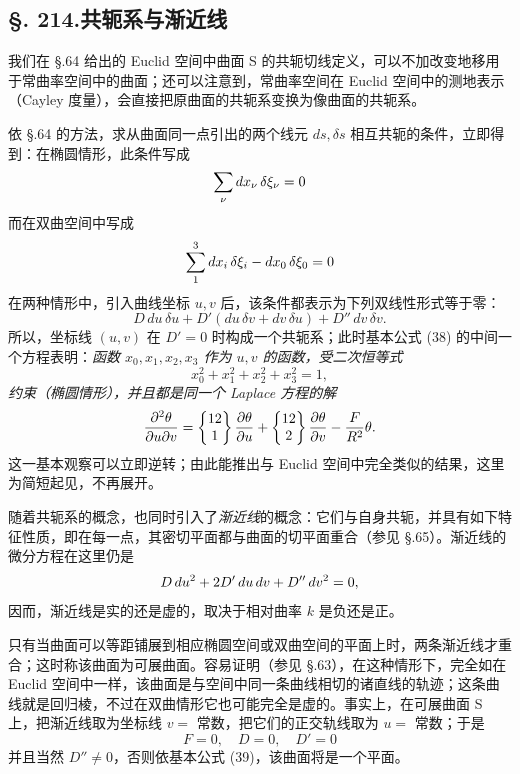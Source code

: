 \subsection*{\S. 214.\quad 共轭系与渐近线}

我们在 \S.64 给出的 Euclid 空间中曲面 S 的共轭切线定义，可以不加改变地移用于常曲率空间中的曲面；还可以注意到，常曲率空间在 Euclid 空间中的测地表示（Cayley 度量），会直接把原曲面的共轭系变换为像曲面的共轭系。

依 \S.64 的方法，求从曲面同一点引出的两个线元 $ds,\delta s$ 相互共轭的条件，立即得到：在椭圆情形，此条件写成
\[
\sum_\nu dx_\nu\,\delta\xi_\nu=0
\]
而在双曲空间中写成
\[
\sum_1^3 dx_i\,\delta\xi_i-dx_0\,\delta \xi_0=0
\]
在两种情形中，引入曲线坐标 $u,v$ 后，该条件都表示为下列双线性形式等于零：
\[
D\,du\,\delta u+D'(du\,\delta v+dv\,\delta u)+D''\,dv\,\delta v.
\]
所以，坐标线 $(u,v)$ 在 $D'=0$ 时构成一个共轭系；此时基本公式 (38) 的中间一个方程表明：\emph{函数 $x_0,x_1,x_2,x_3$ 作为 $u,v$ 的函数，受二次恒等式}
\[
x_0^2+x_1^2+x_2^2+x_3^2=1,
\]
\emph{约束（椭圆情形），并且都是同一个 Laplace 方程的解}
\[
\frac{\partial^2\theta}{\partial u\partial v}=\left\{\begin{matrix}12\\1\end{matrix}\right\}\frac{\partial\theta}{\partial u}+\left\{\begin{matrix}12\\2\end{matrix}\right\}\frac{\partial\theta}{\partial v}-\frac{F}{R^2}\theta.
\]
这一基本观察可以立即逆转；由此能推出与 Euclid 空间中完全类似的结果，这里为简短起见，不再展开。

随着共轭系的概念，也同时引入了\emph{渐近线}的概念：它们与自身共轭，并具有如下特征性质，即在每一点，其密切平面都与曲面的切平面重合（参见 \S.65）。渐近线的微分方程在这里仍是
\[
D\,du^2+2D'\,du\,dv+D''\,dv^2=0,
\]
因而，渐近线是实的还是虚的，取决于相对曲率 $k$ 是负还是正。

只有当曲面可以等距铺展到相应椭圆空间或双曲空间的平面上时，两条渐近线才重合；这时称该曲面为可展曲面。容易证明（参见 \S.63），在这种情形下，完全如在 Euclid 空间中一样，该曲面是与空间中同一条曲线相切的诸直线的轨迹；这条曲线就是回归棱，不过在双曲情形它也可能完全是虚的。事实上，在可展曲面 S 上，把渐近线取为坐标线 $v=$ 常数，把它们的正交轨线取为 $u=$ 常数；于是
\[
F=0,
\quad D=0,
\quad D'=0
\]
并且当然 $D''\ne0$，否则依基本公式 (39)，该曲面将是一个平面。

